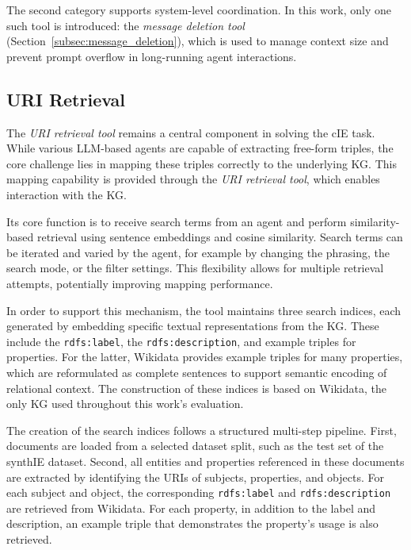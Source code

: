 \documentclass[a4paper,oneside,bibliography=totoc]{scrbook}
\begin{document}
The second category supports system-level coordination. In this work, only one such tool is introduced: the \textit{message deletion tool} (Section~\ref{subsec:message_deletion}), which is used to manage context size and prevent prompt overflow in long-running agent interactions.

\subsection{\ac{URI} Retrieval}
\label{subsec:uri_retrieval}

The \textit{\ac{URI} retrieval tool} remains a central component in solving the \ac{cIE} task. While various \ac{LLM}-based agents are capable of extracting free-form triples, the core challenge lies in mapping these triples correctly to the underlying \ac{KG}. This mapping capability is provided through the \textit{\ac{URI} retrieval tool}, which enables interaction with the \ac{KG}.

Its core function is to receive search terms from an agent and perform similarity-based retrieval using sentence embeddings and cosine similarity. Search terms can be iterated and varied by the agent, for example by changing the phrasing, the search mode, or the filter settings. This flexibility allows for multiple retrieval attempts, potentially improving mapping performance.

In order to support this mechanism, the tool maintains three search indices, each generated by embedding specific textual representations from the \ac{KG}. These include the \texttt{rdfs:label}, the \texttt{rdfs:description}, and example triples for properties. For the latter, Wikidata provides example triples for many properties, which are reformulated as complete sentences to support semantic encoding of relational context. The construction of these indices is based on Wikidata, the only \ac{KG} used throughout this work’s evaluation.

The creation of the search indices follows a structured multi-step pipeline. First, documents are loaded from a selected dataset split, such as the test set of the synthIE dataset. Second, all entities and properties referenced in these documents are extracted by identifying the \acp{URI} of subjects, properties, and objects. For each subject and object, the corresponding \texttt{rdfs:label} and \texttt{rdfs:description} are retrieved from Wikidata. For each property, in addition to the label and description, an example triple that demonstrates the property’s usage is also retrieved.
\end{document}
